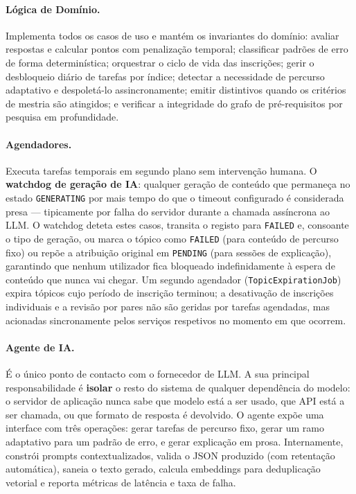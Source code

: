 \paragraph{L\'ogica de Dom\'inio.}
Implementa todos os casos de uso e mant\'em os invariantes do dom\'inio:
avaliar respostas e calcular pontos com penaliza\c{c}\~ao temporal; classificar
padr\~oes de erro de forma determin\'istica; orquestrar o ciclo de vida das
inscri\c{c}\~oes; gerir o desbloqueio di\'ario de tarefas por \'indice; detectar
a necessidade de percurso adaptativo e despolet\'a-lo assincronamente; emitir
distintivos quando os crit\'erios de mestria s\~ao atingidos; e verificar a
integridade do grafo de pr\'e-requisitos por pesquisa em profundidade.

\paragraph{Agendadores.}
Executa tarefas temporais em segundo plano sem interven\c{c}\~ao humana. O \textbf{watchdog de gera\c{c}\~ao de IA}:
qualquer gera\c{c}\~ao de conte\'udo que permane\c{c}a no estado
\texttt{GENERATING} por mais tempo do que o timeout configurado \'e
considerada presa --- tipicamente por falha do servidor durante a chamada
ass\'incrona ao LLM. O watchdog deteta estes casos, transita o registo
para \texttt{FAILED} e, consoante o tipo de gera\c{c}\~ao, ou marca o
t\'opico como \texttt{FAILED} (para conte\'udo de percurso fixo) ou repõe
a atribui\c{c}\~ao original em \texttt{PENDING} (para sess\~oes de
explica\c{c}\~ao), garantindo que nenhum utilizador fica bloqueado
indefinidamente \`a espera de conte\'udo que nunca vai chegar. Um segundo
agendador (\texttt{TopicExpirationJob}) expira t\'opicos cujo per\'iodo de
inscri\c{c}\~ao terminou; a desativa\c{c}\~ao de inscri\c{c}\~oes individuais
e a revis\~ao por pares n\~ao s\~ao geridas por tarefas agendadas, mas
acionadas sincronamente pelos servi\c{c}os respetivos no momento em que
ocorrem.

\paragraph{Agente de IA.}
\'E o \'unico ponto de contacto com o fornecedor de LLM. A sua principal
responsabilidade \'e \textbf{isolar} o resto do sistema de qualquer
depend\^encia do modelo: o servidor de aplica\c{c}\~ao nunca sabe que modelo
est\'a a ser usado, que API est\'a a ser chamada, ou que formato de resposta
\'e devolvido. O agente exp\~oe uma interface com tr\^es opera\c{c}\~oes:
gerar tarefas de percurso fixo, gerar um ramo adaptativo para um padr\~ao
de erro, e gerar explica\c{c}\~ao em prosa. Internamente, constr\'oi prompts
contextualizados, valida o JSON produzido (com retenta\c{c}\~ao autom\'atica),
saneia o texto gerado, calcula embeddings para deduplica\c{c}\~ao vetorial
e reporta m\'etricas de lat\^encia e taxa de falha.

